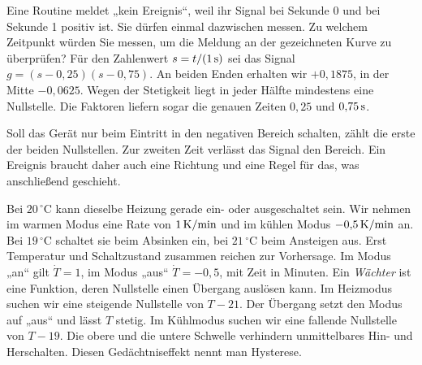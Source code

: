 Eine Routine meldet „kein Ereignis“, weil ihr Signal bei Sekunde 0 und bei Sekunde 1 positiv ist. Sie dürfen einmal dazwischen messen. Zu welchem Zeitpunkt würden Sie messen, um die Meldung an der gezeichneten Kurve zu überprüfen?
Für den Zahlenwert \(s=t/(1\,\mathrm{s})\) sei das Signal \(g=(s-0{,}25)(s-0{,}75)\). An beiden Enden erhalten wir \(+0{,}1875\), in der Mitte \(-0{,}0625\). Wegen der Stetigkeit liegt in jeder Hälfte mindestens eine Nullstelle. Die Faktoren liefern sogar die genauen Zeiten \(0{,}25\) und \(0{,}75\,\mathrm{s}\).

Soll das Gerät nur beim Eintritt in den negativen Bereich schalten, zählt die erste der beiden Nullstellen. Zur zweiten Zeit verlässt das Signal den Bereich. Ein Ereignis braucht daher auch eine Richtung und eine Regel für das, was anschließend geschieht.


Bei \(20\,^\circ\mathrm C\) kann dieselbe Heizung gerade ein- oder ausgeschaltet sein. Wir nehmen im warmen Modus eine Rate von \(1\,\mathrm{K/min}\) und im kühlen Modus \(-0{,}5\,\mathrm{K/min}\) an. Bei \(19\,^\circ\mathrm C\) schaltet sie beim Absinken ein, bei \(21\,^\circ\mathrm C\) beim Ansteigen aus. Erst Temperatur und Schaltzustand zusammen reichen zur Vorhersage.
Im Modus „an“ gilt \(\dot T=1\), im Modus „aus“ \(\dot T=-0{,}5\), mit Zeit in Minuten. Ein \emph{Wächter} ist eine Funktion, deren Nullstelle einen Übergang auslösen kann. Im Heizmodus suchen wir eine steigende Nullstelle von \(T-21\). Der Übergang setzt den Modus auf „aus“ und lässt \(T\) stetig. Im Kühlmodus suchen wir eine fallende Nullstelle von \(T-19\). Die obere und die untere Schwelle verhindern unmittelbares Hin- und Herschalten. Diesen Gedächtniseffekt nennt man Hysterese.


